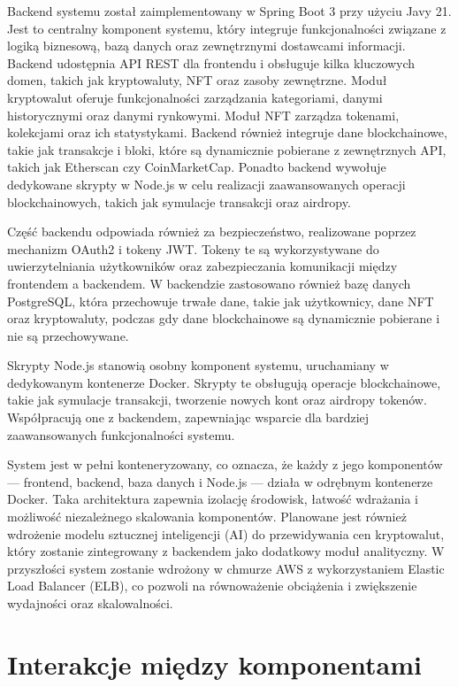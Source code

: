 Backend systemu został zaimplementowany w Spring Boot 3 przy użyciu Javy 21. Jest to centralny komponent systemu, który integruje funkcjonalności związane z logiką biznesową, bazą danych oraz zewnętrznymi dostawcami informacji. Backend udostępnia API REST dla frontendu i obsługuje kilka kluczowych domen, takich jak kryptowaluty, NFT oraz zasoby zewnętrzne. Moduł kryptowalut oferuje funkcjonalności zarządzania kategoriami, danymi historycznymi oraz danymi rynkowymi. Moduł NFT zarządza tokenami, kolekcjami oraz ich statystykami. Backend również integruje dane blockchainowe, takie jak transakcje i bloki, które są dynamicznie pobierane z zewnętrznych API, takich jak Etherscan czy CoinMarketCap. Ponadto backend wywołuje dedykowane skrypty w Node.js w celu realizacji zaawansowanych operacji blockchainowych, takich jak symulacje transakcji oraz airdropy.

Część backendu odpowiada również za bezpieczeństwo, realizowane poprzez mechanizm OAuth2 i tokeny JWT. Tokeny te są wykorzystywane do uwierzytelniania użytkowników oraz zabezpieczania komunikacji między frontendem a backendem. W backendzie zastosowano również bazę danych PostgreSQL, która przechowuje trwałe dane, takie jak użytkownicy, dane NFT oraz kryptowaluty, podczas gdy dane blockchainowe są dynamicznie pobierane i nie są przechowywane.

Skrypty Node.js stanowią osobny komponent systemu, uruchamiany w dedykowanym kontenerze Docker. Skrypty te obsługują operacje blockchainowe, takie jak symulacje transakcji, tworzenie nowych kont oraz airdropy tokenów. Współpracują one z backendem, zapewniając wsparcie dla bardziej zaawansowanych funkcjonalności systemu.

System jest w pełni konteneryzowany, co oznacza, że każdy z jego komponentów — frontend, backend, baza danych i Node.js — działa w odrębnym kontenerze Docker. Taka architektura zapewnia izolację środowisk, łatwość wdrażania i możliwość niezależnego skalowania komponentów. Planowane jest również wdrożenie modelu sztucznej inteligencji (AI) do przewidywania cen kryptowalut, który zostanie zintegrowany z backendem jako dodatkowy moduł analityczny. W przyszłości system zostanie wdrożony w chmurze AWS z wykorzystaniem Elastic Load Balancer (ELB), co pozwoli na równoważenie obciążenia i zwiększenie wydajności oraz skalowalności.

\section{Interakcje między komponentami}


